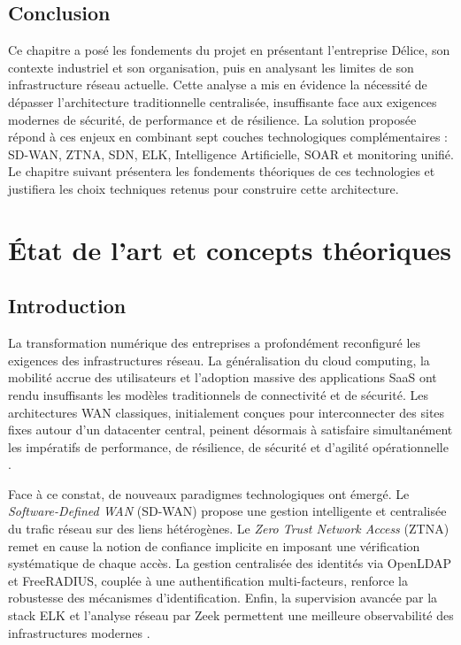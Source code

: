 \documentclass[12pt,a4paper,oneside]{report}
\begin{document}
	\section*{Conclusion}
	Ce chapitre a posé les fondements du projet en présentant l'entreprise Délice, son contexte industriel et son organisation, puis en analysant les limites de son infrastructure réseau actuelle. Cette analyse a mis en évidence la nécessité de dépasser l'architecture traditionnelle centralisée, insuffisante face aux exigences modernes de sécurité, de performance et de résilience.
	La solution proposée répond à ces enjeux en combinant sept couches technologiques complémentaires : SD-WAN, ZTNA, SDN, ELK, Intelligence Artificielle, SOAR et monitoring unifié. Le chapitre suivant présentera les fondements théoriques de ces technologies et justifiera les choix techniques retenus pour construire cette architecture.
	\newpage
	
	\chapter{État de l'art et concepts théoriques}
	
	\section*{Introduction}
	
	La transformation numérique des entreprises a profondément reconfiguré les exigences des infrastructures réseau. La généralisation du cloud computing, la mobilité accrue des utilisateurs et l'adoption massive des applications SaaS ont rendu insuffisants les modèles traditionnels de connectivité et de sécurité. Les architectures WAN classiques, initialement conçues pour interconnecter des sites fixes autour d'un datacenter central, peinent désormais à satisfaire simultanément les impératifs de performance, de résilience, de sécurité et d'agilité opérationnelle \cite{cisco_sdw_design}.
	
	Face à ce constat, de nouveaux paradigmes technologiques ont émergé. Le \textit{Software-Defined WAN} (SD-WAN) propose une gestion intelligente et centralisée du trafic réseau sur des liens hétérogènes. Le \textit{Zero Trust Network Access} (ZTNA) remet en cause la notion de confiance implicite en imposant une vérification systématique de chaque accès. La gestion centralisée des identités via OpenLDAP et FreeRADIUS, couplée à une authentification multi-facteurs, renforce la robustesse des mécanismes d'identification. Enfin, la supervision avancée par la stack ELK et l'analyse réseau par Zeek permettent une meilleure observabilité des infrastructures modernes \cite{nist_zero_trust,openziti_docs,elastic_stack_docs,zeek_docs}.
	
\end{document}
